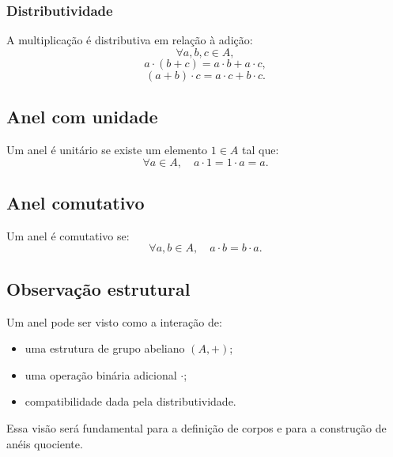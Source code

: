 \documentclass[../../main]{subfiles}
\begin{document}
\subsubsection{Distributividade}

A multiplicação é distributiva em relação à adição:
\[
	\forall a,b,c \in A,
\]
\[
	a \cdot (b+c) = a \cdot b + a \cdot c,
\]
\[
	(a+b) \cdot c = a \cdot c + b \cdot c.
\]

\subsection{Anel com unidade}

Um anel é unitário se existe um elemento $1 \in A$ tal que:
\[
	\forall a \in A,\quad a \cdot 1 = 1 \cdot a = a.
\]

\subsection{Anel comutativo}

Um anel é comutativo se:
\[
	\forall a,b \in A,\quad a \cdot b = b \cdot a.
\]

\subsection{Observação estrutural}

Um anel pode ser visto como a interação de:

\begin{itemize}
	\item uma estrutura de grupo abeliano $(A,+)$;
	\item uma operação binária adicional $\cdot$;
	\item compatibilidade dada pela distributividade.
\end{itemize}

Essa visão será fundamental para a definição de corpos e para a construção de anéis quociente.
\end{document}
